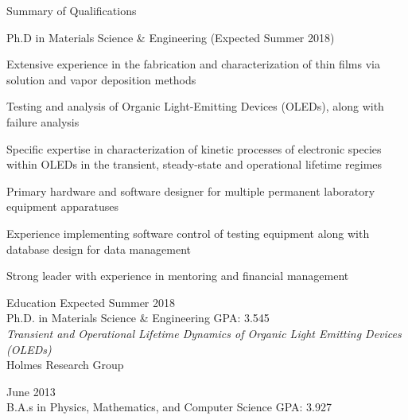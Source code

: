 \documentclass{resume} %
\begin{document}

\begin{rSection}{Summary of Qualifications}
\item Ph.D in Materials Science \& Engineering (Expected Summer 2018)
\item Extensive experience in the fabrication and characterization of thin films via solution and vapor deposition methods
\item Testing and analysis of Organic Light-Emitting Devices (OLEDs), along with failure analysis
\item Specific expertise in characterization of kinetic processes of electronic species within OLEDs in the transient, steady-state and operational lifetime regimes
\item Primary hardware and software designer for multiple permanent laboratory equipment apparatuses
\item Experience implementing software control of testing equipment along with database design for data management 
\item Strong leader with experience in mentoring and financial management 


\end{rSection}


\begin{rSection}{Education}
\hspace{-.5em}{\bf University of Minnesota} \hfill { Expected Summer 2018} \\
Ph.D. in Materials Science \& Engineering \hfill GPA: 3.545\\
{\em Transient and Operational Lifetime Dynamics of Organic Light Emitting Devices (OLEDs)}\\
Holmes Research Group   \vspace{-1ex}

\hspace{-.5em}{\bf Coe College} \hfill { June 2013} \\ 
B.A.s in Physics, Mathematics, and Computer Science \hfill GPA: 3.927
\end{rSection}
\end{document}
